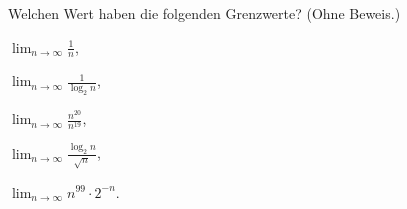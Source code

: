 \documentclass{uebung_cs}
\begin{document}
\begin{aufgabe}[Grenzwerte]
    Welchen Wert haben die folgenden Grenzwerte? (Ohne Beweis.)
    \begin{enumerate*}
        \item $\lim_{n\to\infty} \tfrac1{n}$,\;
        \item $\lim_{n\to\infty} \tfrac1{\log_2 n}$,\;
        \item $\lim_{n\to\infty} \tfrac{n^{20}}{n^{19}}$,\;
        \item $\lim_{n\to\infty} \tfrac{\log_2 n}{\sqrt{n}}$,\;
        \item $\lim_{n\to\infty} n^{99} \cdot 2^{-n}$.
    \end{enumerate*}
\end{aufgabe}
\end{document}
